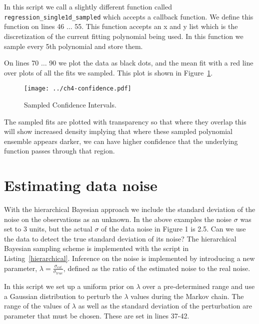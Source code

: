 \documentclass{tufte-handout}
\begin{document}
In this script we call a slightly different function called {\tt
  regression\_single1d\_sampled} which accepts a callback function.
We define this function on lines 46 $\ldots$ 55. This function 
accepts an x and y list which is the discretization of the current 
fitting polynomial being used. In this function we sample every
5th polynomial and store them. 

On lines 70 $\ldots$ 90 we plot the data as black dots, and
the mean fit with a red line over plots of all the fits we sampled.
This plot is shown in Figure~\ref{fig:confidence}.

\begin{figure}
\texttt{[image: ../ch4-confidence.pdf]}
\caption{Sampled Confidence Intervals.}
\label{fig:confidence}
\end{figure}

The sampled fits are plotted with transparency so that where they
overlap this will show increased density implying that where these
sampled polynomial ensemble appears darker, we can have higher 
confidence that the underlying function passes through that
region.

\section{Estimating data noise}

With the hierarchical Bayesian approach we include the standard deviation
of the noise on the observations as an unknown. In the above examples
the noise $\sigma$ was set to 3 units, but the actual $\sigma$
of the data noise in Figure 1 is 2.5.
Can we use the data to detect the true standard deviation of its noise?
The hierarchical Bayesian sampling scheme is implemented with the script 
in Listing~\ref{hierarchical}. Inference on the noise is implemented by 
introducing a new parameter, $\lambda = \frac{\sigma_{est}}{\sigma_{true}}$, 
defined as the ratio of the estimated noise to the real noise.

\lstset{caption=Hierarchical Bayesian sampling to determine the data noise standard deviation, label=hierarchical} 


In this script we set up a uniform prior on $\lambda$ over a pre-determined range and use
a Gaussian distribution to perturb the $\lambda$ values during the Markov chain.
The range of the values of $\lambda$ as well as the standard deviation of the
perturbation are parameter that must be chosen. These are set in lines
37-42. 
\end{document}
